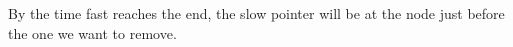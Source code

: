 \documentclass[preview]{standalone}
\begin{document}
By the time fast reaches the end, the slow pointer will be at the node just before the one we want to remove.\\
\end{document}
